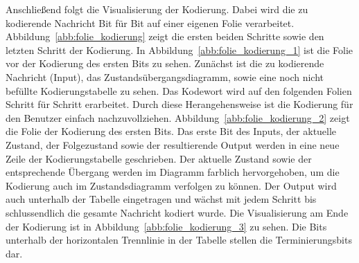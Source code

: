Anschließend folgt die Visualisierung der Kodierung. Dabei wird die zu kodierende Nachricht Bit für Bit auf einer eigenen Folie verarbeitet. Abbildung~\ref{abb:folie_kodierung} zeigt die ersten beiden Schritte sowie den letzten Schritt der Kodierung. In Abbildung~\ref{abb:folie_kodierung_1} ist die Folie vor der Kodierung des ersten Bits zu sehen. Zunächst ist die zu kodierende Nachricht (Input), das Zustandsübergangsdiagramm, sowie eine noch nicht befüllte Kodierungstabelle zu sehen. Das Kodewort wird auf den folgenden Folien Schritt für Schritt erarbeitet. Durch diese Herangehensweise ist die Kodierung für den Benutzer einfach nachzuvollziehen. Abbildung~\ref{abb:folie_kodierung_2} zeigt die Folie der Kodierung des ersten Bits. Das erste Bit des Inputs, der aktuelle Zustand, der Folgezustand sowie der resultierende Output werden in eine neue Zeile der Kodierungstabelle geschrieben. Der aktuelle Zustand sowie der entsprechende Übergang werden im Diagramm farblich hervorgehoben, um die Kodierung auch im Zustandsdiagramm verfolgen zu können. Der Output wird auch unterhalb der Tabelle eingetragen und wächst mit jedem Schritt bis schlussendlich die gesamte Nachricht kodiert wurde. Die Visualisierung am Ende der Kodierung ist in Abbildung~\ref{abb:folie_kodierung_3} zu sehen. Die Bits unterhalb der horizontalen Trennlinie in der Tabelle stellen die Terminierungsbits dar.
